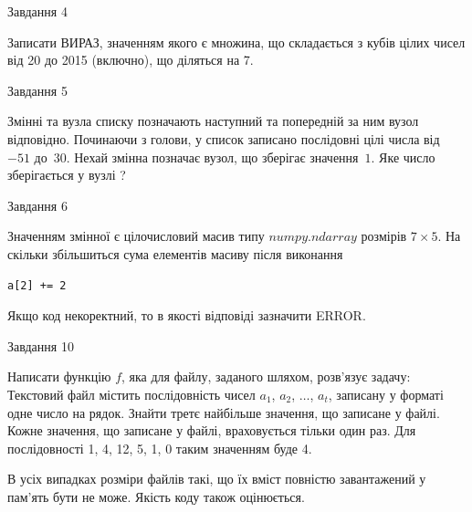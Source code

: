 \documentclass[12pt, ukrainian]{article}
\begin{document}
{               
{\begin{center}Завдання {4}\end{center}}
\vspace{-6mm}
Записати ВИРАЗ, значенням якого є множина, що складається з кубів цілих чисел від 20 до 2015 (включно), що діляться на 7.\par

\vspace{10mm}
               
{\begin{center}Завдання {5}\end{center}}
\vspace{-6mm}
Змінні  та  вузла списку позначають наступний та попередній за ним вузол відповідно. Починаючи з голови, у список записано послідовні цілі числа від~$-51$ до~$30$. Нехай змінна  позначає вузол, що зберігає значення~$1$.
Яке число зберігається у вузлі  ?\par

               
{\begin{center}Завдання {6}\end{center}}
\vspace{-6mm}
Значенням змінної  є цілочисловий масив типу $numpy.ndarray$ розмірів $7{\times}5$. На скільки збільшиться сума елементів масиву  після виконання
\begin{verbatim}
a[2] += 2
\end{verbatim}


Якщо код некоректний, то в якості відповіді зазначити ERROR.\par

               
{\begin{center}Завдання {10}\end{center}}
\vspace{-6mm}

Написати функцію $f$, яка для файлу, заданого шляхом, розв’язує задачу:\\ Текстовий файл містить послідовність чисел $a_1$, $a_2$, $\ldots$, $a_t$, записану у форматі одне число на рядок. Знайти третє найбільше значення, що записане у файлі. Кожне значення, що записане у файлі, враховується тільки один раз. Для послідовності 1, 4, 12, 5, 1, 0 таким значенням буде 4.

В усіх випадках розміри файлів такі, що їх вміст повністю завантажений у пам'ять бути не може. Якість коду також оцінюється.



}
\end{document}
